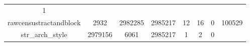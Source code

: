 \documentclass[]{book}
\theoremstyle{definition}
\theoremstyle{definition}
\theoremstyle{definition}
\theoremstyle{remark}
\begin{document}
\begin{longtable}[]{@{}cccccccc@{}}
\begin{minipage}[t]{0.09\columnwidth}
1\strut
\end{minipage}\tabularnewline
\begin{minipage}[t]{0.23\columnwidth}\centering\strut
rawcensustractandblock\strut
\end{minipage} & \begin{minipage}[t]{0.09\columnwidth}\centering\strut
2932\strut
\end{minipage} & \begin{minipage}[t]{0.10\columnwidth}\centering\strut
2982285\strut
\end{minipage} & \begin{minipage}[t]{0.09\columnwidth}\centering\strut
2985217\strut
\end{minipage} & \begin{minipage}[t]{0.05\columnwidth}\centering\strut
12\strut
\end{minipage} & \begin{minipage}[t]{0.05\columnwidth}\centering\strut
16\strut
\end{minipage} & \begin{minipage}[t]{0.07\columnwidth}\centering\strut
0\strut
\end{minipage} & \begin{minipage}[t]{0.09\columnwidth}\centering\strut
100529\strut
\end{minipage}\tabularnewline
\begin{minipage}[t]{0.23\columnwidth}\centering\strut
str\_arch\_style\strut
\end{minipage} & \begin{minipage}[t]{0.09\columnwidth}\centering\strut
2979156\strut
\end{minipage} & \begin{minipage}[t]{0.10\columnwidth}\centering\strut
6061\strut
\end{minipage} & \begin{minipage}[t]{0.09\columnwidth}\centering\strut
2985217\strut
\end{minipage} & \begin{minipage}[t]{0.05\columnwidth}\centering\strut
1\strut
\end{minipage} & \begin{minipage}[t]{0.05\columnwidth}\centering\strut
2\strut
\end{minipage} & \begin{minipage}[t]{0.07\columnwidth}\centering\strut
0\strut
\end{minipage} & \begin{minipage}[t]{0.09\columnwidth}\centering\strut

\end{minipage}
\end{longtable}
\end{document}
